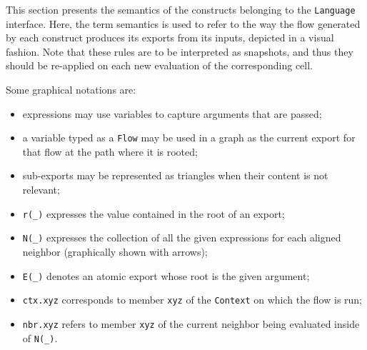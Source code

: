 This section presents the semantics of the constructs belonging to the \texttt{Language} interface.
%
Here, the term semantics is used to refer to the way the flow generated by each construct produces its exports from its inputs, depicted in a visual fashion.
%
Note that these rules are to be interpreted as snapshots, and thus they should be re-applied on each new evaluation of the corresponding cell.

Some graphical notations are:
%
\begin{itemize}
    \item expressions may use variables to capture arguments that are passed;
    \item a variable typed as a \texttt{Flow} may be used in a graph as the current export for that flow at the path where it is rooted;
    \item sub-exports may be represented as triangles when their content is not relevant;
    \item \texttt{r(\_)} expresses the value contained in the root of an export;
    \item \texttt{N(\_)} expresses the collection of all the given expressions for each aligned neighbor (graphically shown with arrows);
    \item \texttt{E(\_)} denotes an atomic export whose root is the given argument;
    \item \texttt{ctx.xyz} corresponds to member \texttt{xyz} of the \texttt{Context} on which the flow is run;
    \item \texttt{nbr.xyz} refers to member \texttt{xyz} of the current neighbor being evaluated inside of \texttt{N(\_)}.
\end{itemize}

